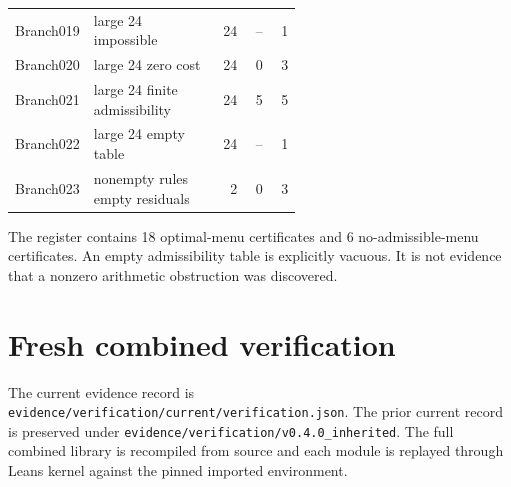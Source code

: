 \documentclass[11pt,letterpaper,oneside,openany]{book}
\theoremstyle{quiet}
\begin{document}
\begin{longtable}{@{}p{0.14\linewidth}p{0.43\linewidth}rrr@{}}
Branch019 & large 24 impossible & 24 & -- & 1\\

Branch020 & large 24 zero cost & 24 & 0 & 3\\

Branch021 & large 24 finite admissibility & 24 & 5 & 5\\

Branch022 & large 24 empty table & 24 & -- & 1\\

Branch023 & nonempty rules empty residuals & 2 & 0 & 3\\

\bottomrule\end{longtable}

The register contains 18 optimal-menu certificates and 6 no-admissible-menu certificates. An empty admissibility table is explicitly vacuous. It is not evidence that a nonzero arithmetic obstruction was discovered.

\section{Fresh combined verification}

The current evidence record is \nolinkurl{evidence/verification/current/verification.json}. The prior current record is preserved under \nolinkurl{evidence/verification/v0.4.0_inherited}. The full combined library is recompiled from source and each module is replayed through Lean\textquotesingle s kernel against the pinned imported environment.
\end{document}
